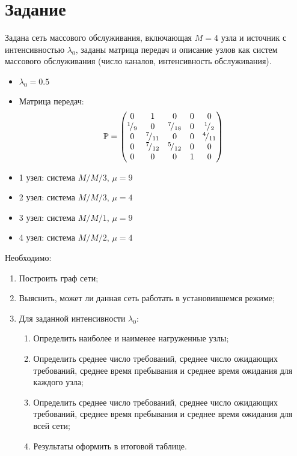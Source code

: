 





\section{Задание}

Задана сеть массового обслуживания, включающая $M = 4$ узла и источник с интенсивностью $\lambda_0$, заданы матрица передач и описание узлов как систем массового обслуживания (число каналов, интенсивность обслуживания).

\begin{itemize}
	\item $\lambda_0 = 0.5$
	\item Матрица передач:
	\begin{equation*}
		\mathbb{P} = \begin{pmatrix}
			0 & 1 & 0 & 0 & 0 \\
			{}^{1}\!/_{9} & 0 & {}^{7}\!/_{18} & 0 & {}^{1}\!/_{2} \\
			0 & {}^{7}\!/_{11} & 0 & 0 & {}^{4}\!/_{11} \\
			0 & {}^{7}\!/_{12} & {}^{5}\!/_{12} & 0 & 0 \\
			0 & 0 & 0 & 1 & 0
		\end{pmatrix}
	\end{equation*}
	\item 1 узел: система $M/M/3$, $\mu = 9$
	\item 2 узел: система $M/M/3$, $\mu = 4$
	\item 3 узел: система $M/M/1$, $\mu = 9$
	\item 4 узел: система $M/M/2$, $\mu = 4$
\end{itemize}

Необходимо:

\begin{enumerate}
	\item Построить граф сети;
	\item Выяснить, может ли данная сеть работать в установившемся режиме;
	\item Для заданной интенсивности $\lambda_0$:
		\begin{enumerate}[label*=\arabic*]
			\item Определить наиболее и наименее нагруженные узлы;
			\item Определить среднее число требований, среднее число ожидающих требований,
			среднее время пребывания и среднее время ожидания для каждого узла;
			\item Определить среднее число требований, среднее число ожидающих требований,
			среднее время пребывания и среднее время ожидания для всей сети;
			\item Результаты оформить в итоговой таблице.
		\end{enumerate}
\end{enumerate}

